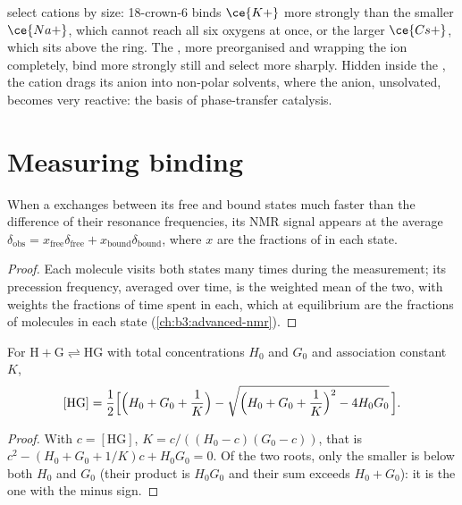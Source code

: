  select cations by size: 18-crown-6 binds $\ce{K+}$ more strongly than the
smaller $\ce{Na+}$, which cannot reach all six oxygens at once, or the larger $\ce{Cs+}$, which
sits above the ring. The , more preorganised and wrapping the ion
completely, bind more strongly still and select more sharply. Hidden inside
the , the cation drags its anion into non-polar solvents, where the anion,
unsolvated, becomes very reactive: the basis of phase-transfer catalysis.

\section{Measuring binding}

\begin{proposition}\label{prop:b3:supramolecular:fast-exchange}
When a  exchanges between its free and bound states much faster than the
difference of their resonance frequencies, its NMR signal appears at the average
$\delta_{\mathrm{obs}} = x_{\mathrm{free}}\delta_{\mathrm{free}} + x_{\mathrm{bound}}\delta_{\mathrm{bound}}$, where $x$ are the fractions of  in each state.
\end{proposition}

\begin{proof}
Each  molecule visits both states many times during the measurement; its
precession frequency, averaged over time, is the weighted mean of the two, with
weights the fractions of time spent in each, which at equilibrium are the
fractions of molecules in each state (\cref{ch:b3:advanced-nmr}).
\end{proof}

\begin{theorem}\label{thm:b3:supramolecular:isotherm}
For $\mathrm{H + G \rightleftharpoons HG}$ with total concentrations $H_0$ and $G_0$ and association constant $K$,
\[
  [\mathrm{HG}] = \frac{1}{2}\Bigl[\Bigl(H_0 + G_0 + \frac1K\Bigr) - \sqrt{\Bigl(H_0 + G_0 + \frac1K\Bigr)^2 - 4H_0G_0}\,\Bigr].
\]
\end{theorem}

\begin{proof}
With $c = [\mathrm{HG}]$, $K = c/((H_0 - c)(G_0 - c))$, that is $c^2 - (H_0 + G_0 + 1/K)c + H_0G_0 = 0$. Of the two roots,
only the smaller is below both $H_0$ and $G_0$ (their product is $H_0G_0$ and their sum
exceeds $H_0 + G_0$): it is the one with the minus sign.
\end{proof}

